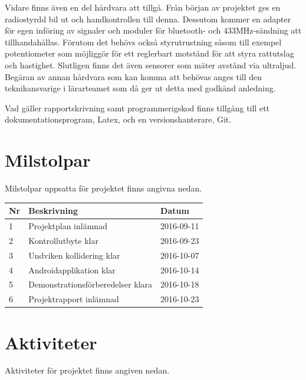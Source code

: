 \documentclass[a4paper]{article}
\begin{document}
Vidare finns även en del hårdvara att tillgå. Från början av projektet ges en radiostyrdd bil ut och handkontrollen till denna. Dessutom kommer en adapter för egen införing av signaler och moduler för bluetooth- och 433MHz-sändning att tillhandahållas. Förutom det behövs också styrutrustning såsom till exempel potentiometer som möjliggör för ett reglerbart motstånd för att styra rattutslag och hastighet. Slutligen finns det även sensorer som mäter avstånd via ultraljud. Begäran av annan hårdvara som kan komma att behövas anges till den teknikansvarige i lärarteamet som då ger ut detta med godkänd anledning.
 
Vad gäller rapportskrivning samt programmerigskod finns tillgång till ett dokumentationsprogram, Latex, och en versionshanterare, Git. 

\section{Milstolpar}
Milstolpar uppsatta för projektet finns angivna nedan.
\vspace{5mm}

\begin{tabular}{|l|l|l|} \hline
\bf Nr & \bf Beskrivning & \bf Datum \\ \hline \hline
1 & Projektplan inlämnad & 2016-09-11 \\\hline
2 & Kontrollutbyte klar & 2016-09-23 \\ \hline
3 & Undviken kollidering klar & 2016-10-07 \\ \hline
4 & Androidapplikation klar & 2016-10-14 \\ \hline
5 & Demonstrationsförberedelser klara & 2016-10-18 \\ \hline
6 & Projektrapport inlämnad & 2016-10-23 \\ \hline

\end{tabular}

\section{Aktiviteter}
Aktiviteter för projektet finns angiven nedan.
\vspace{5mm}
\end{document}
